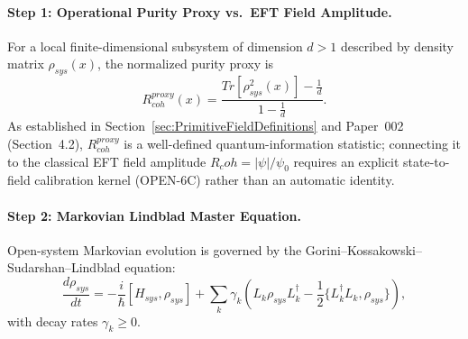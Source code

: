 \documentclass[american,11pt,letterpaper]{article}
\newcommand{\Rcoh}{R_{\mathrm{coh}}}
\def\mathrm#1{#1}%
\def\texttt#1{#1}%
\def\Rcoh{R_coh}%
\begin{document}
\paragraph{Step 1: Operational Purity Proxy vs.\ EFT Field Amplitude.}
For a local finite-dimensional subsystem of dimension $d > 1$ described by density matrix $\rho_{\mathrm{sys}}(x)$, the normalized purity proxy is
\begin{equation}
    R_{\mathrm{coh}}^{\mathrm{proxy}}(x) = \frac{\mathrm{Tr}[\rho_{\mathrm{sys}}^2(x)] - \frac{1}{d}}{1 - \frac{1}{d}}.
\label{eq:Rcoh_purity_relation}
\end{equation}
As established in Section~\ref{sec:PrimitiveFieldDefinitions} and Paper~002 (Section~4.2), $R_{\mathrm{coh}}^{\mathrm{proxy}}$ is a well-defined quantum-information statistic; connecting it to the classical EFT field amplitude $\Rcoh = |\psi|/\psi_0$ requires an explicit state-to-field calibration kernel (\texttt{OPEN-6C}) rather than an automatic identity.

\paragraph{Step 2: Markovian Lindblad Master Equation.}
Open-system Markovian evolution is governed by the Gorini--Kossakowski--Sudarshan--Lindblad equation:
\begin{equation}
    \frac{d\rho_{\mathrm{sys}}}{dt} = -\frac{i}{\hbar}[H_{\mathrm{sys}}, \rho_{\mathrm{sys}}] + \sum_k \gamma_k \left( L_k \rho_{\mathrm{sys}} L_k^\dagger - \frac{1}{2}\{L_k^\dagger L_k, \rho_{\mathrm{sys}}\} \right),
    \label{eq:Lindblad_equation}
\end{equation}
with decay rates $\gamma_k \ge 0$.
\end{document}
